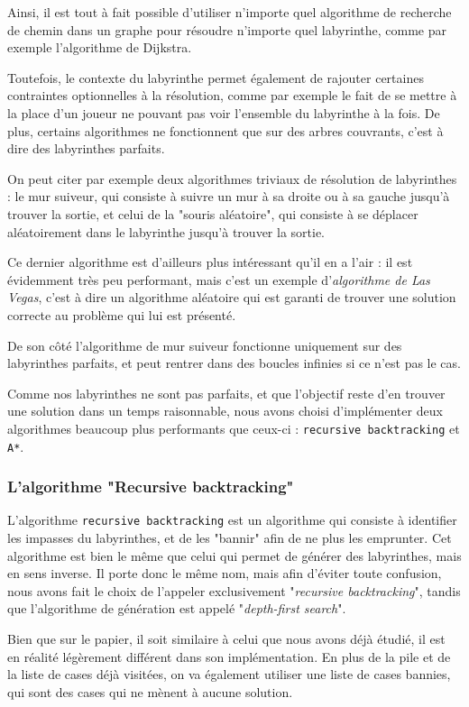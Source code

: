 \documentclass[12pt]{scrreprt} %
\begin{document}
Ainsi, il est tout à fait possible d'utiliser n'importe quel algorithme de recherche de chemin dans un graphe pour résoudre n'importe quel labyrinthe, comme par exemple l'algorithme de Dijkstra.

Toutefois, le contexte du labyrinthe permet également de rajouter certaines contraintes optionnelles à la résolution, comme par exemple le fait de se mettre à la place d'un joueur ne pouvant pas voir l'ensemble du labyrinthe à la fois. De plus, certains algorithmes ne fonctionnent que sur des arbres couvrants, c'est à dire des labyrinthes parfaits.

On peut citer par exemple deux algorithmes triviaux de résolution de labyrinthes : le mur suiveur, qui consiste à suivre un mur à sa droite ou à sa gauche jusqu'à trouver la sortie, et celui de la "souris aléatoire", qui consiste à se déplacer aléatoirement dans le labyrinthe jusqu'à trouver la sortie.

Ce dernier algorithme est d'ailleurs plus intéressant qu'il en a l'air : il est évidemment très peu performant, mais c'est un exemple d'\textit{algorithme de Las Vegas}, c'est à dire un algorithme aléatoire qui est garanti de trouver une solution correcte au problème qui lui est présenté.

De son côté l'algorithme de mur suiveur fonctionne uniquement sur des labyrinthes parfaits, et peut rentrer dans des boucles infinies si ce n'est pas le cas.

Comme nos labyrinthes ne sont pas parfaits, et que l'objectif reste d'en trouver une solution dans un temps raisonnable, nous avons choisi d'implémenter deux algorithmes beaucoup plus performants que ceux-ci : \texttt{recursive backtracking} et \texttt{A*}.

\subsubsection{L'algorithme "Recursive backtracking"}

L'algorithme \texttt{recursive backtracking} est un algorithme qui consiste à identifier les impasses du labyrinthes, et de les "bannir" afin de ne plus les emprunter. Cet algorithme est bien le même que celui qui permet de générer des labyrinthes, mais en sens inverse. Il porte donc le même nom, mais afin d'éviter toute confusion, nous avons fait le choix de l'appeler exclusivement "\textit{recursive backtracking}", tandis que l'algorithme de génération est appelé "\textit{depth-first search}".

Bien que sur le papier, il soit similaire à celui que nous avons déjà étudié, il est en réalité légèrement différent dans son implémentation. En plus de la pile et de la liste de cases déjà visitées, on va également utiliser une liste de cases bannies, qui sont des cases qui ne mènent à aucune solution.
\end{document}
